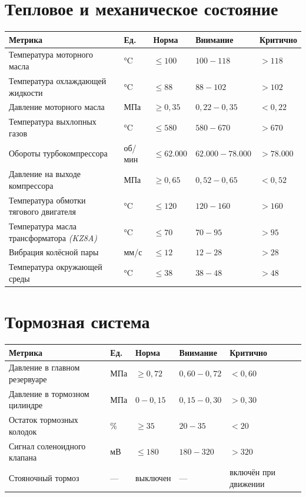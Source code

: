 \documentclass[a4paper,11pt]{article}
\newcommand{\metricsheader}{%
  \rowcolor{headerbg}
  \color{headertext}\textbf{Метрика} &
  \color{headertext}\textbf{Ед.} &
  \color{headertext}\textbf{Норма} &
  \color{headertext}\textbf{Внимание} &
  \color{headertext}\textbf{Критично} \\
}
\begin{document}
\section{Тепловое и механическое состояние}
\begin{tabularx}{\textwidth}{L{6.0cm} C{1.2cm} L{2.4cm} L{2.6cm} L{2.2cm}}
\toprule
\metricsheader
\midrule
{} Температура моторного масла              & °C     & $\leq 100$      & $100 - 118$           & $> 118$   \\
 Температура охлаждающей жидкости         & °C     & $\leq 88$       & $88 - 102$            & $> 102$   \\
 Давление моторного масла                 & МПа    & $\geq 0{,}35$   & $0{,}22 - 0{,}35$     & $< 0{,}22$ \\
 Температура выхлопных газов              & °C     & $\leq 580$      & $580 - 670$           & $> 670$   \\
 Обороты турбокомпрессора                 & об/мин & $\leq 62{.}000$ & $62{.}000 - 78{.}000$ & $> 78{.}000$ \\
 Давление на выходе компрессора           & МПа    & $\geq 0{,}65$   & $0{,}52 - 0{,}65$     & $< 0{,}52$ \\
 Температура обмотки тягового двигателя   & °C     & $\leq 120$      & $120 - 160$           & $> 160$   \\
 Температура масла трансформатора \textit{(KZ8A)} & °C & $\leq 70$  & $70 - 95$             & $> 95$    \\
 Вибрация колёсной пары                   & мм/с   & $\leq 12$       & $12 - 28$             & $> 28$    \\
 Температура окружающей среды             & °C     & $\leq 38$       & $38 - 48$             & $> 48$    \\
\bottomrule
\end{tabularx}

\section{Тормозная система}
\begin{tabularx}{\textwidth}{L{6.0cm} C{1.2cm} L{2.4cm} L{2.6cm} L{2.4cm}}
\toprule
\metricsheader
\midrule
{} Давление в главном резервуаре          & МПа & $\geq 0{,}72$ & $0{,}60 - 0{,}72$ & $< 0{,}60$ \\
 Давление в тормозном цилиндре          & МПа & $0 - 0{,}15$  & $0{,}15 - 0{,}30$ & $> 0{,}30$ \\
 Остаток тормозных колодок              & \%  & $\geq 35$     & $20 - 35$         & $< 20$     \\
 Сигнал соленоидного клапана            & мВ  & $\leq 180$    & $180 - 320$       & $> 320$    \\
 Стояночный тормоз                      & —   & выключен      & —                 & включён при движении \\
\bottomrule
\end{tabularx}
\end{document}
